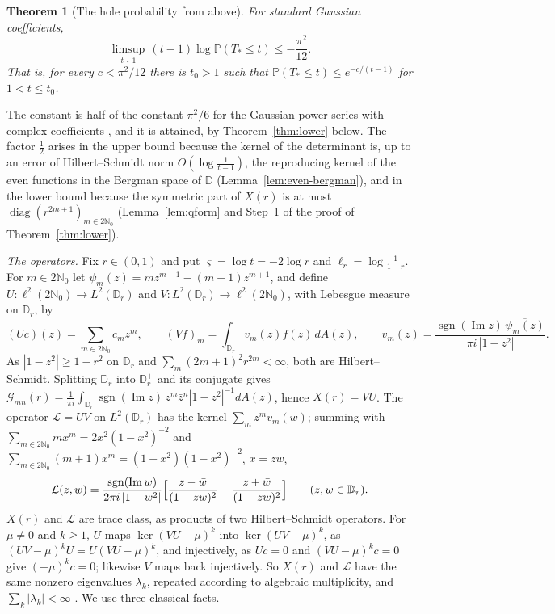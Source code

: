 \documentclass[11pt]{amsart}
\newtheorem{theorem}{Theorem}[section]
\theoremstyle{definition}
\theoremstyle{remark}
\numberwithin{equation}{section}
\newcommand{\N}{\mathbb{N}}
\newcommand{\D}{\mathbb{D}}
\newcommand{\PP}{\mathbb{P}}
\DeclareMathOperator{\im}{Im}
\begin{document}
\begin{theorem}[The hole probability from above]\label{thm:sharp}
For standard Gaussian coefficients,
\[
\limsup_{t\downarrow1}\,(t-1)\log\PP(T_*\le t)\le-\frac{\pi^2}{12}.
\]
That is, for every $c<\pi^2/12$ there is $t_0>1$ such that $\PP(T_*\le t)\le e^{-c/(t-1)}$ for $1<t\le t_0$.
\end{theorem}

The constant is half of the constant $\pi^2/6$ for the Gaussian power series with complex coefficients \cite{PV}, and it is attained, by Theorem~\ref{thm:lower} below. The factor $\frac12$ arises in the upper bound because the kernel of the determinant is, up to an error of Hilbert--Schmidt norm $O(\log\frac1{t-1})$, the reproducing kernel of the even functions in the Bergman space of $\D$ (Lemma~\ref{lem:even-bergman}), and in the lower bound because the symmetric part of $X(r)$ is at most $\operatorname{diag}(r^{2m+1})_{m\in2\N_0}$ (Lemma~\ref{lem:qform} and Step~1 of the proof of Theorem~\ref{thm:lower}).

\emph{The operators.} Fix $r\in(0,1)$ and put $\varsigma=\log t=-2\log r$ and $\ell_r=\log\frac1{1-r}$. For $m\in2\N_0$ let $\psi_m(z)=mz^{m-1}-(m+1)z^{m+1}$, and define $U:\ell^2(2\N_0)\to L^2(\D_r)$ and $V:L^2(\D_r)\to\ell^2(2\N_0)$, with Lebesgue measure on $\D_r$, by
\[
(Uc)(z)=\sum_{m\in2\N_0}c_mz^m,\qquad(Vf)_m=\int_{\D_r}v_m(z)f(z)\,dA(z),\qquad v_m(z)=\frac{\operatorname{sgn}(\im z)\,\overline{\psi_m(z)}}{\pi i\,|1-z^2|}.
\]
As $|1-z^2|\ge1-r^2$ on $\D_r$ and $\sum_m(2m+1)^2r^{2m}<\infty$, both are Hilbert--Schmidt. Splitting $\D_r$ into $\D_r^+$ and its conjugate gives $\mathcal G_{mn}(r)=\frac1{\pi i}\int_{\D_r}\operatorname{sgn}(\im z)\,z^m\bar z^n|1-z^2|^{-1}dA(z)$, hence $X(r)=VU$. The operator $\mathcal L=UV$ on $L^2(\D_r)$ has the kernel $\sum_mz^mv_m(w)$; summing with $\sum_{m\in2\N_0}mx^m=2x^2(1-x^2)^{-2}$ and $\sum_{m\in2\N_0}(m+1)x^m=(1+x^2)(1-x^2)^{-2}$, $x=z\bar w$,
\begin{equation}\label{eq:Lkernel}
\mathcal L(z,w)=\frac{\operatorname{sgn}(\im w)}{2\pi i\,|1-w^2|}\Bigl[\frac{z-\bar w}{(1-z\bar w)^2}-\frac{z+\bar w}{(1+z\bar w)^2}\Bigr]\qquad(z,w\in\D_r).
\end{equation}
$X(r)$ and $\mathcal L$ are trace class, as products of two Hilbert--Schmidt operators. For $\mu\ne0$ and $k\ge1$, $U$ maps $\ker(VU-\mu)^k$ into $\ker(UV-\mu)^k$, as $(UV-\mu)^kU=U(VU-\mu)^k$, and injectively, as $Uc=0$ and $(VU-\mu)^kc=0$ give $(-\mu)^kc=0$; likewise $V$ maps back injectively. So $X(r)$ and $\mathcal L$ have the same nonzero eigenvalues $\lambda_k$, repeated according to algebraic multiplicity, and $\sum_k|\lambda_k|<\infty$ \cite[Proposition~14.21]{vN}. We use three classical facts.
\end{document}
